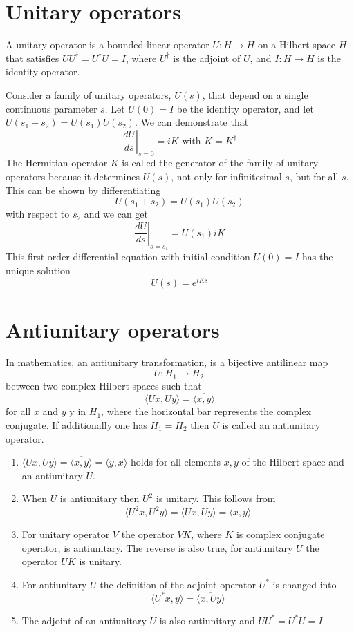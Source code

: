 \section{Unitary operators}
\begin{newdef}
 A unitary operator is a bounded linear operator $U: H\to H$ on a Hilbert space $H$ that satisfies $UU^{\dagger} = U^{\dagger}U =I$, where $U^{\dagger}$ is the adjoint of $U$, and $I: H \to H$ is the identity operator.
\end{newdef}
\noindent
Consider a family of unitary operators, $U(s)$, that depend on a single continuous parameter $s$. 
Let $U(0) = I $ be the identity operator, and let $U(s_1+s_2) = U(s_1)U(s_2)$.
We can demonstrate that
\[\left. \frac{dU}{ds}\right|_{s=0} = iK \mbox{ with } K = K^{\dagger}\]
The Hermitian operator $K$ is called the generator of the family of unitary operators because it determines $U(s)$, not only for infinitesimal $s$, but for all $s$. This can be shown by differentiating
\[U(s_1+s_2) = U(s_1)U(s_2)\]
with respect to $s_2$ and we can get
\[\left. \frac{dU}{ds}\right|_{s=s_1} = U(s_1)iK \]
This first order differential equation with initial condition $U(0) = I$ has the unique solution
\[U(s) = e^{iKs}\]

\section{Antiunitary operators}
\begin{newdef}
In mathematics, an antiunitary transformation, is a bijective antilinear map
\[U:H_{1}\to H_{2}\,\]
between two complex Hilbert spaces such that
\[\langle Ux,Uy\rangle ={\overline {\langle x,y\rangle }}\]
for all $x$ and $y$ y in $H_{1}$, where the horizontal bar represents the complex conjugate. If additionally one has $H_{1}=H_{2}$ then $U$ is called an antiunitary operator.
\end{newdef}

\begin{newprop}
\begin{enumerate}
\item $\langle Ux,Uy\rangle =\overline {\langle x,y\rangle }=\langle y,x\rangle$ holds for all elements $x, y$ of the Hilbert space and an antiunitary $U$.
\item When $U$ is antiunitary then $U^{2}$ is unitary. This follows from
\[ \langle U^{2}x,U^{2}y\rangle =\overline {\langle Ux,Uy\rangle }=\langle x,y\rangle\]
\item For unitary operator $V$ the operator $VK$, where $K$ is complex conjugate operator, is antiunitary. The reverse is also true, for antiunitary $U$ the operator $UK$ is unitary.
\item For antiunitary $U$ the definition of the adjoint operator $U^{*}$ is changed into
\[\langle U^{*}x,y\rangle =\overline {\langle x,Uy\rangle }\]
\item The adjoint of an antiunitary $U$ is also antiunitary and $UU^{*}=U^{*}U=I$.
\end{enumerate}
\end{newprop}

